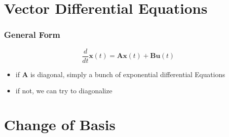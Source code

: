 \documentclass[aspectratio=169]{beamer}
\newcommand{\diff}[1]{\frac{d}{d #1}}
\begin{document}
\section{Vector Differential Equations}

\begin{frame}
    \frametitle{General Form}

    \begin{equation}
        \diff{t} \bm{x}(t) = \bm{Ax}(t) + \bm{Bu}(t)
    \end{equation}
    \begin{itemize}
        \item if \(\bm{A}\) is diagonal, simply a bunch of exponential differential Equations
        \item if not, we can try to diagonalize
    \end{itemize}
\end{frame}

\section{Change of Basis}
\end{document}

